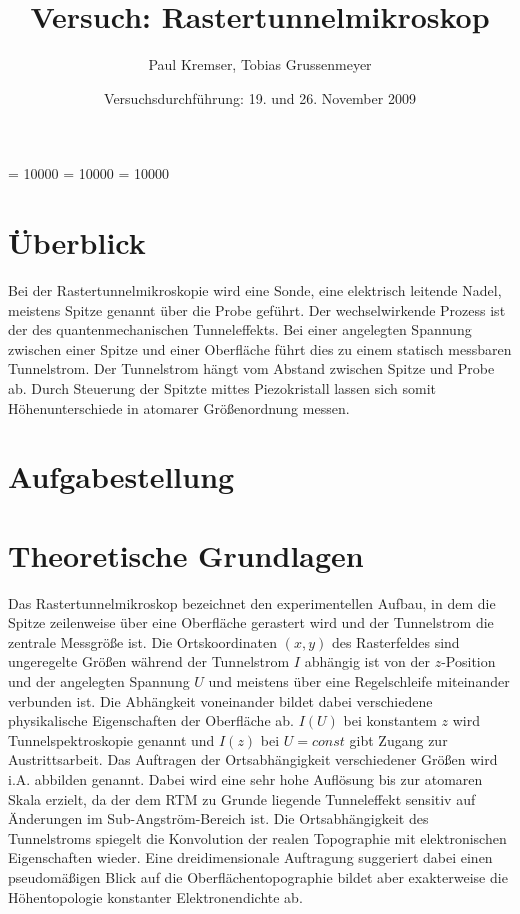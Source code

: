 \documentclass[12pt]{article}
\newcommand{\changefont}[3]{
\fontfamily{#1} \fontseries{#2} \fontshape{#3} \selectfont}
\begin{document}
\clubpenalty = 10000
\widowpenalty = 10000 
\displaywidowpenalty = 10000

\onehalfspacing
\changefont{ptm}{m}{n} 

\begin{titlepage}
\author{Paul Kremser, Tobias Grussenmeyer}
\title{Versuch: Rastertunnelmikroskop}
\date{Versuchsdurchführung: 19. und 26. November 2009} 
\maketitle
\thispagestyle{empty}
\end{titlepage}


\tableofcontents
\thispagestyle{empty}
\newpage
{}
\section{Überblick}
Bei der Rastertunnelmikroskopie wird eine Sonde, eine elektrisch leitende Nadel, meistens Spitze genannt über die Probe geführt. Der wechselwirkende Prozess ist der des quantenmechanischen Tunneleffekts. Bei einer angelegten Spannung zwischen einer Spitze und einer Oberfläche führt dies zu einem statisch messbaren Tunnelstrom. Der Tunnelstrom hängt vom Abstand zwischen Spitze und Probe ab. Durch Steuerung der Spitzte mittes Piezokristall lassen sich somit Höhenunterschiede in atomarer Größenordnung messen.

\section{Aufgabestellung}

\section{Theoretische Grundlagen}
Das Rastertunnelmikroskop bezeichnet den experimentellen Aufbau, in dem die Spitze zeilenweise über eine Oberfläche gerastert wird und der Tunnelstrom die zentrale Messgröße ist. Die Ortskoordinaten $(x,y)$ des Rasterfeldes sind ungeregelte Größen während der Tunnelstrom $I$ abhängig ist von der $z$-Position und der angelegten Spannung $U$ und meistens über eine Regelschleife miteinander verbunden ist. Die Abhängkeit voneinander bildet dabei verschiedene physikalische Eigenschaften der Oberfläche ab. $I(U)$ bei konstantem $z$ wird Tunnelspektroskopie genannt und $I(z)$ bei $U = const$ gibt Zugang zur Austrittsarbeit. Das Auftragen der Ortsabhängigkeit verschiedener Größen wird i.A. abbilden genannt. Dabei wird eine sehr hohe Auflösung bis zur atomaren Skala erzielt, da der dem RTM zu Grunde liegende Tunneleffekt sensitiv auf Änderungen im Sub-Angström-Bereich ist. Die Ortsabhängigkeit des Tunnelstroms spiegelt die Konvolution der realen Topographie mit elektronischen Eigenschaften wieder. Eine dreidimensionale Auftragung suggeriert dabei einen pseudomäßigen Blick auf die Oberflächentopographie bildet aber exakterweise die Höhentopologie konstanter Elektronendichte ab.
\end{document}
